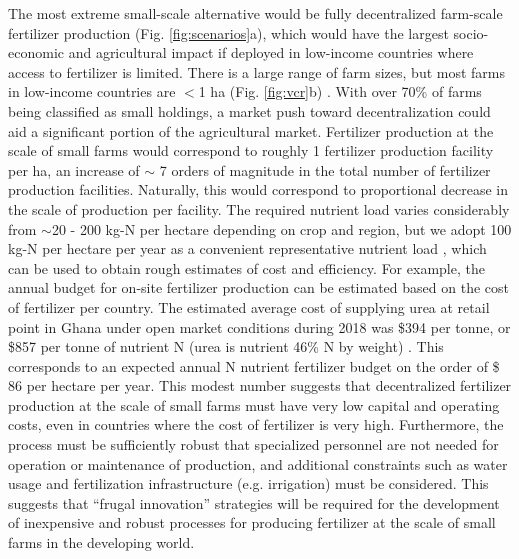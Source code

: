 The most extreme small-scale alternative would be fully decentralized farm-scale fertilizer production (Fig. \ref{fig:scenarios}a), which would have the largest socio-economic and agricultural impact if deployed in low-income countries where access to fertilizer is limited. There is a large range of farm sizes, but most farms in low-income countries are $<$1 ha (Fig. \ref{fig:vcr}b)\cite{Lowder_2016} . With over 70\% of farms being classified as small holdings, a market push toward decentralization could aid a significant portion of the agricultural market. Fertilizer production at the scale of small farms would  correspond to roughly 1 fertilizer production facility per ha, an increase of $\sim$ 7 orders of magnitude in the total number of fertilizer production facilities. Naturally, this would correspond to proportional decrease in the scale of production per facility.
The required nutrient load varies considerably from $\sim$20 - 200 kg-N per hectare depending on crop and region, but we adopt 100 kg-N per hectare per year as a convenient representative nutrient load \cite{Medford_2017}, which can be used to obtain rough estimates of cost and efficiency. For example, the annual budget for on-site fertilizer production can be estimated based on the cost of fertilizer per country. The estimated average cost of supplying urea at retail point in Ghana under open market conditions during 2018 was \$394 per tonne, or \$857 per tonne of nutrient N (urea is nutrient 46\% N by weight) \cite{africa_fert_2017}.
 This corresponds to an expected annual N nutrient fertilizer budget on the order of \$ 86 per hectare per year. This modest number suggests that decentralized fertilizer production at the scale of small farms must have very low capital and operating costs, even in countries where the cost of fertilizer is very high. Furthermore, the process must be sufficiently robust that specialized personnel are not needed for operation or maintenance of production, and additional constraints such as water usage and fertilization infrastructure (e.g. irrigation) must be considered. 
 This suggests that ``frugal innovation'' strategies \cite{Weyrauch_2016} will be required for the development of inexpensive and robust processes for producing fertilizer at the scale of small farms in the developing world. 
 
